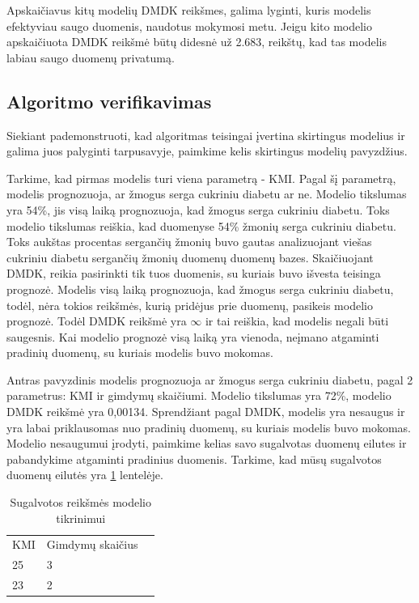 \documentclass{VUMIFInfBakalaurinis}
\begin{document}
\par Apskaičiavus kitų modelių DMDK reikšmes, galima lyginti, kuris modelis efektyviau saugo duomenis, naudotus mokymosi metu. Jeigu kito modelio apskaičiuota DMDK reikšmė būtų didesnė už 2.683, reikštų, kad tas modelis labiau saugo duomenų privatumą.

\subsection{Algoritmo verifikavimas}
\par Siekiant pademonstruoti, kad algoritmas teisingai įvertina skirtingus modelius ir galima juos palyginti tarpusavyje, paimkime kelis skirtingus modelių pavyzdžius.
\par Tarkime, kad pirmas modelis turi viena parametrą - KMI. Pagal šį parametrą, modelis prognozuoja, ar žmogus serga cukriniu diabetu ar ne. Modelio tikslumas yra 54\%, jis visą laiką prognozuoja, kad žmogus serga cukriniu diabetu. Toks modelio tikslumas reiškia, kad duomenyse 54\% žmonių serga cukriniu diabetu. Toks aukštas procentas sergančių žmonių buvo gautas analizuojant viešas cukriniu diabetu sergančių žmonių duomenų duomenų bazes. Skaičiuojant DMDK, reikia pasirinkti tik tuos duomenis, su kuriais buvo išvesta teisinga prognozė. Modelis visą laiką prognozuoja, kad žmogus serga cukriniu diabetu, todėl, nėra tokios reikšmės, kurią pridėjus prie duomenų, pasikeis modelio prognozė. Todėl DMDK reikšmė yra $\infty$ ir tai reiškia, kad modelis negali būti saugesnis. Kai modelio prognozė visą laiką yra vienoda, neįmano atgaminti pradinių duomenų, su kuriais modelis buvo mokomas.
\par Antras pavyzdinis modelis prognozuoja ar žmogus serga cukriniu diabetu, pagal 2 parametrus: KMI ir gimdymų skaičiumi. Modelio tikslumas yra 72\%, modelio DMDK reikšmė yra 0,00134. Sprendžiant pagal DMDK, modelis yra nesaugus ir yra labai priklausomas nuo pradinių duomenų, su kuriais modelis buvo mokomas. Modelio nesaugumui įrodyti, paimkime kelias savo sugalvotas duomenų eilutes ir pabandykime atgaminti pradinius duomenis. Tarkime, kad mūsų sugalvotos duomenų eilutės yra \ref{tab:KMI ir gimdymų skaičius} lentelėje.

\begin{table}[h]
\centering
\begin{tabular}{|l|l|l|}
\cline{1-2}
KMI & Gimdymų skaičius \\\cline{1-2}
25      & 3 \\\cline{1-2}
23       & 2 \\\cline{1-2}
\end{tabular}
\caption{Sugalvotos reikšmės modelio tikrinimui}
\label{tab:KMI ir gimdymų skaičius}
\end{table}
\end{document}
